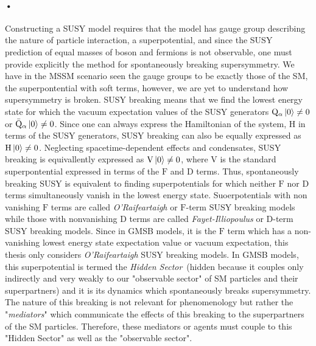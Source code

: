 {\paragraph*{•}
Constructing a SUSY model requires that the model has gauge group describing the nature of particle interaction, a superpotential, and since the SUSY prediction of equal masses of boson and fermions is not observable, one must provide explicitly the method for spontaneously breaking supersymmetry. We have in the MSSM scenario seen the gauge groups to be exactly those of the SM, the superpontential with soft terms, however, we are yet to understand how supersymmetry is broken. SUSY breaking means that we find the lowest energy state for which the vacuum expectation values of the  SUSY generators $\mathrm{Q}_{\alpha} \left|0\right\rangle \neq 0$ or $\bar{\mathrm{Q}}_{\alpha}\left|0\right\rangle \neq 0$. Since one can always express the Hamiltonian of the system, $\mathrm{H}$ in terms of the SUSY generators, SUSY breaking can also be equally expressed as $\mathrm{H}\left|0\right\rangle \neq 0$. Neglecting spacetime-dependent effects and condensates, SUSY breaking is equivallently expressed as $\mathrm{V}\left|0\right\rangle \neq 0$, where $\mathrm{V}$ is the standard superpontential expressed in terms of the $\mathrm{F}$ and $\mathrm{D}$ terms. Thus, spontaneously breaking SUSY is equivalent to finding superpotentials for which neither $\mathrm{F}$ nor $\mathrm{D}$ terms simultaneously vanish in the lowest energy state. Suoerpotentials with non vanishing $\mathrm{F}$ terms are called  \textit{O'Raifeartaigh} or $\mathrm{F}$-term SUSY breaking models while those with nonvanishing $\mathrm{D}$ terms are called \textit{Fayet-Illiopoulus} or $\mathrm{D}$-term SUSY breaking models. Since in GMSB models, it is the $\mathrm{F}$ term which has a non-vanishing lowest energy state expectation value or vacuum expectation, this thesis only considers  \textit{O'Raifeartaigh} SUSY breaking models.
\newline
In GMSB models, this superpotential is termed the \textit{Hidden Sector}~(hidden because it couples only indirectly and very weakly to our "observable sector" of SM particles and their superpartners) and it is its dynamics which spontaneously breaks supersymmetry. The nature of this breaking is not relevant for phenomenology but rather the "\textit{mediators}" which communicate the effects of this breaking to the superpartners of the SM particles. Therefore, these mediators or agents must couple to this "Hidden Sector" as well as the "observable sector".
}
